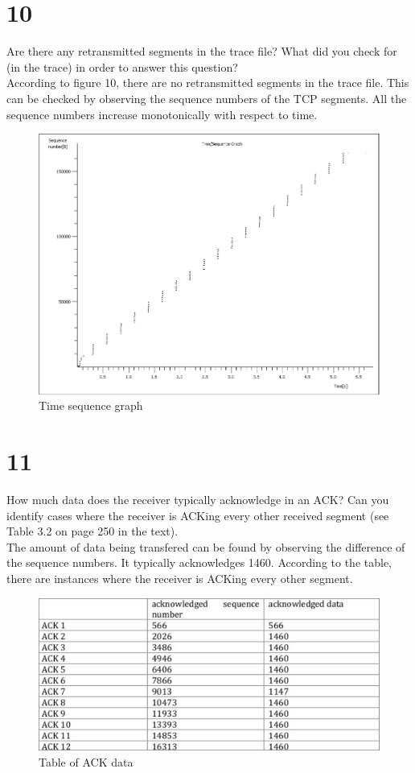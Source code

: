 \documentclass{article}
\begin{document}
\section*{10}
Are there any retransmitted segments in the trace file? What did you check for (in
the trace) in order to answer this question?\\
\newline According to figure 10, there are no retransmitted segments in the trace file. This can be checked by observing the sequence numbers of the TCP segments.  All the sequence numbers increase monotonically with respect to time.\\ 
\begin{figure}[h!]
\centering
\includegraphics[scale=0.5]{Q13.png}
\caption{Time sequence graph}
\end{figure}
\clearpage

\section*{11}
How much data does the receiver typically acknowledge in an ACK? Can you
identify cases where the receiver is ACKing every other received segment (see
Table 3.2 on page 250 in the text).\\
\newline The amount of data being transfered can be found by observing the difference of the sequence numbers.  It typically acknowledges 1460.  According to the table, there are instances where the receiver is ACKing every other segment.\\
\begin{figure}[h!]
\centering
\includegraphics[scale=0.4]{Q11.png}
\caption{Table of ACK data}
\end{figure}
\end{document}
